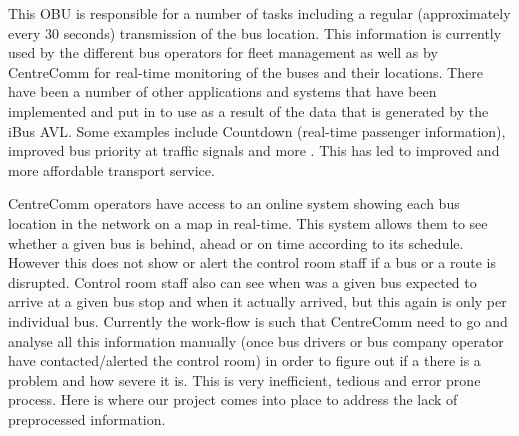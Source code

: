 This OBU is responsible for a number of tasks including a regular (approximately every 30 seconds) transmission of the bus location. This information is currently used by the different bus operators for fleet management as well as by CentreComm for real-time monitoring of the buses and their locations. There have been a number of other applications and systems that have been implemented and put in to use as a result of the data that is generated by the iBus AVL. Some examples include Countdown (real-time passenger information), improved bus priority at traffic signals and more \cite{Hounsell201276}. This has led to improved and more affordable transport service.

CentreComm operators have access to an online system showing each bus location in the network on a map in real-time. This system allows them to see whether a given bus is behind, ahead or on time according to its schedule. However this does not show or alert the control room staff if a bus or a route is disrupted. Control room staff also can see when was a given bus expected to arrive at a given bus stop and when it actually arrived, but this again is only per individual bus. Currently the work-flow is such that CentreComm need to go and analyse all this information manually (once bus drivers or bus company operator have contacted/alerted the control room) in order to figure out if a there is a problem and how severe it is. This is very inefficient, tedious and error prone process. Here is where our project comes into place to address the lack of preprocessed information.

